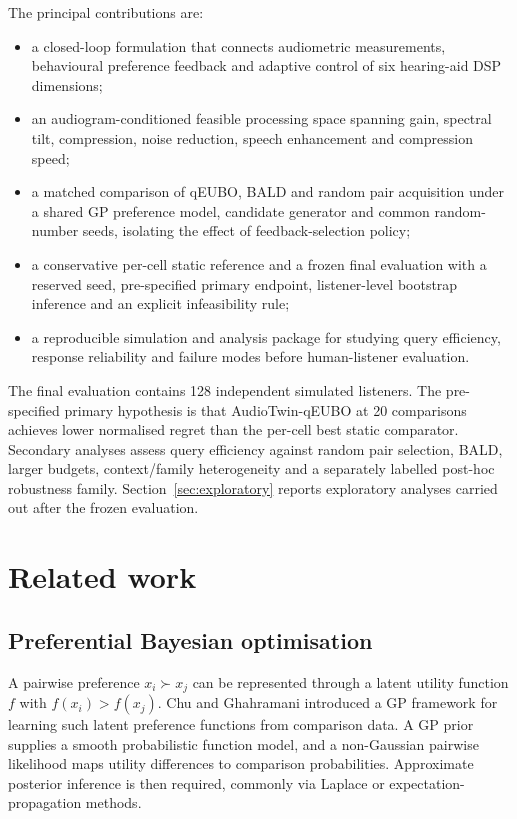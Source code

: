 \documentclass[preprint,12pt]{elsarticle}
\begin{document}
The principal contributions are:
\begin{itemize}
    \item a closed-loop formulation that connects audiometric measurements, behavioural preference feedback and adaptive control of six hearing-aid DSP dimensions;
    \item an audiogram-conditioned feasible processing space spanning gain, spectral tilt, compression, noise reduction, speech enhancement and compression speed;
    \item a matched comparison of qEUBO, BALD and random pair acquisition under a shared GP preference model, candidate generator and common random-number seeds, isolating the effect of feedback-selection policy;
    \item a conservative per-cell static reference and a frozen final evaluation with a reserved seed, pre-specified primary endpoint, listener-level bootstrap inference and an explicit infeasibility rule;
    \item a reproducible simulation and analysis package for studying query efficiency, response reliability and failure modes before human-listener evaluation.
\end{itemize}

The final evaluation contains 128 independent simulated listeners. The pre-specified primary hypothesis is that AudioTwin-qEUBO at 20 comparisons achieves lower normalised regret than the per-cell best static comparator. Secondary analyses assess query efficiency against random pair selection, BALD, larger budgets, context/family heterogeneity and a separately labelled post-hoc robustness family. Section~\ref{sec:exploratory} reports exploratory analyses carried out after the frozen evaluation.

\section{Related work}
\label{sec:related}

\subsection{Preferential Bayesian optimisation}

A pairwise preference $x_i \succ x_j$ can be represented through a latent utility function $f$ with $f(x_i)>f(x_j)$. Chu and Ghahramani \cite{chu2005} introduced a GP framework for learning such latent preference functions from comparison data. A GP prior supplies a smooth probabilistic function model, and a non-Gaussian pairwise likelihood maps utility differences to comparison probabilities. Approximate posterior inference is then required, commonly via Laplace or expectation-propagation methods.
\end{document}
